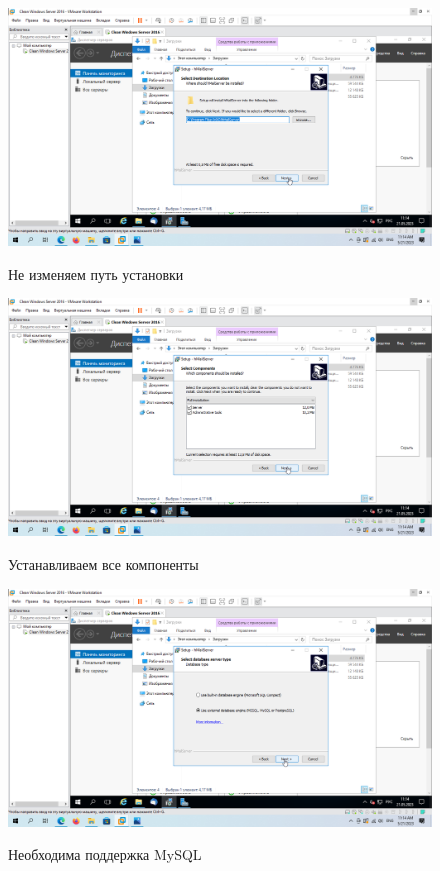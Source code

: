 \documentclass[a4paper]{article}
\begin{document}
  \begin{figure}[H]
    \centering
    \includegraphics[width=\textwidth]{11_0049}
    \label{img:49}
    \caption{Не изменяем путь установки}
  \end{figure}

  \begin{figure}[H]
    \centering
    \includegraphics[width=\textwidth]{11_0050}
    \label{img:50}
    \caption{Устанавливаем все компоненты}
  \end{figure}

  \begin{figure}[H]
    \centering
    \includegraphics[width=\textwidth]{11_0051}
    \label{img:51}
    \caption{Необходима поддержка MySQL}
  \end{figure}
\end{document}
